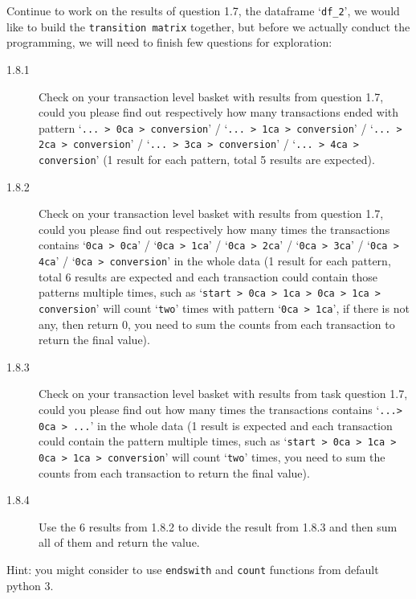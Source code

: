 \documentclass[a4paper]{article}
\begin{document}
    
    \begin{answer}[Question 1.8]
     Continue to work on the results of question 1.7, the dataframe `\texttt{df_2}', we would like to build the \texttt{transition matrix} together, but before we actually conduct the programming, we will need to finish few questions for exploration:

     \begin{description}
         \item[1.8.1] Check on your transaction level basket with results from question 1.7, could you please find out respectively how many transactions ended with pattern `\texttt{... > 0ca > conversion}' / `\texttt{... > 1ca > conversion}' / `\texttt{... > 2ca > conversion}' / `\texttt{... > 3ca > conversion}' / `\texttt{... > 4ca > conversion}' (1 result for each pattern, total 5 results are expected).

         \item[1.8.2] Check on your transaction level basket with results from question 1.7, could you please find out respectively how many times the transactions contains `\texttt{0ca > 0ca}' / `\texttt{0ca > 1ca}' / `\texttt{0ca > 2ca}' / `\texttt{0ca > 3ca}' / `\texttt{0ca > 4ca}' / `\texttt{0ca > conversion}' in the whole data (1 result for each pattern, total 6 results are expected and each transaction could contain those patterns multiple times, such as `\texttt{start > 0ca > 1ca > 0ca > 1ca > conversion}' will count `\texttt{two}' times with pattern `\texttt{0ca > 1ca}', if there is not any, then return 0, you need to sum the counts from each transaction to return the final value).

         \item[1.8.3] Check on your transaction level basket with results from task question 1.7, could you please find out how many times the transactions contains `\texttt{...> 0ca > ...}' in the whole data (1 result is expected and each transaction could contain the pattern multiple times, such as `\texttt{start > 0ca > 1ca > 0ca > 1ca > conversion}' will count `\texttt{two}' times, you need to sum the counts from each transaction to return the final value).

         \item[1.8.4] Use the 6 results from 1.8.2 to divide the result from 1.8.3 and then sum all of them and return the value.
     \end{description}

     Hint: you might consider to use \texttt{endswith} and \texttt{count} functions from default python 3.
     
    \end{answer}
\end{document}

